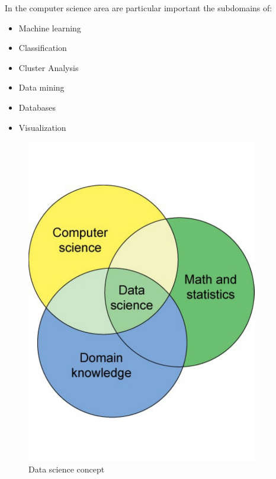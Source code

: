 \begin{minipage}{0.5\textwidth}
In the computer science area are particular important the subdomains of:
\begin{itemize}
\item Machine learning
\item Classification
\item Cluster Analysis
\item Data mining
\item Databases
\item Visualization
\end{itemize}
\end{minipage} \hfill
\begin{minipage}{0.50\textwidth}
\begin{figure}[H]
	\centering
    \includegraphics[trim={0 3cm 0 3cm},clip,width=0.9\textwidth]{Files/Data_Science_Concept.pdf}
    \caption{Data science concept}
    \label{fig: Data_science}
\end{figure}
\end{minipage}
\newpage 

